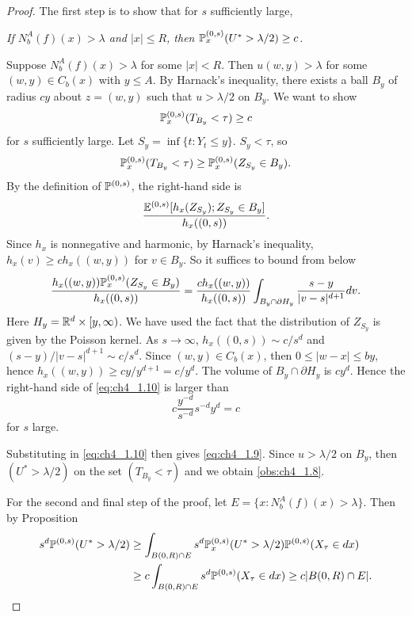 \begin{proof}
The first step is to show that for $s$ sufficiently large,
\begin{obs}\label{obs:ch4_1.8}
    \textit{If $N_b^A(f)(x) > \lambda$ and $|x| \leq R$, then $\P_x^{(0,s)}(U^* > \lambda/2) \geq c$.}
\end{obs}

Suppose $N_b^A(f)(x) > \lambda$ for some $|x| < R$. Then $u(w,y) > \lambda$ for some $(w,y) \in C_b(x)$ with $y \leq A$. By Harnack's inequality, there exists a ball $B_y$ of radius $cy$ about $z=(w,y)$ such that $u > \lambda/2$ on $B_y$. We want to show
\begin{equation}\label{eq:ch4_1.9}
    \P_x^{(0,s)}(T_{B_y} < \tau) \geq c
\end{equation}
for $s$ sufficiently large. Let $S_y = \inf\{t : Y_t \leq y\}$. $S_y < \tau$, so
\[
    \P_x^{(0,s)}(T_{B_y} < \tau) \geq \P_x^{(0,s)}(Z_{S_y} \in B_y).
\]
By the definition of $\P^{(0,s)}$, the right-hand side is
\[
    \frac{\E^{(0,s)}[h_x(Z_{S_y}); Z_{S_y} \in B_y]}{h_x((0,s))}.
\]
\mnewpage
Since $h_x$ is nonnegative and harmonic, by Harnack's inequality, $h_x(v) \geq ch_x((w,y))$ for $v \in B_y$. So it suffices to bound from below
\begin{equation}\label{eq:ch4_1.10}
    \frac{h_x((w,y))\P_x^{(0,s)}(Z_{S_y} \in B_y)}{h_x((0,s))} = \frac{ch_x((w,y))}{h_x((0,s))}\int_{B_y \cap \partial H_y} \frac{s-y}{|v-s|^{d+1}}dv.
\end{equation}
Here $H_y = \R^d \times [y,\infty)$. We have used the fact that the distribution of $Z_{S_y}$ is given by the Poisson kernel. As $s \to \infty$, $h_x((0,s)) \sim c/s^d$ and $(s-y)/|v-s|^{d+1} \sim c/s^d$. Since $(w,y) \in C_b(x)$, then $0 \leq |w-x| \leq by$, hence $h_x((w,y)) \geq cy/y^{d+1} = c/y^d$. The volume of $B_y \cap \partial H_y$ is $cy^d$. Hence the right-hand side of \eqref{eq:ch4_1.10} is larger than
\[
    c\frac{y^{-d}}{s^{-d}} s^{-d}y^d = c
\]
for $s$ large.

Substituting in \eqref{eq:ch4_1.10} then gives \eqref{eq:ch4_1.9}. Since $u > \lambda/2$ on $B_y$, then $(U^* > \lambda/2)$ on the set $(T_{B_y} < \tau)$ and we obtain \eqref{obs:ch4_1.8}.

For the second and final step of the proof, let $E = \{x : N_b^A(f)(x) > \lambda\}$. Then by Proposition 
\begin{align*}
    s^d\P^{(0,s)}(U^* > \lambda/2) &\geq \int_{B(0,R)\cap E} s^d\P_x^{(0,s)}(U^* > \lambda/2)\P^{(0,s)}(X_\tau \in dx) \\
    &\geq c\int_{B(0,R)\cap E} s^d\P^{(0,s)}(X_\tau \in dx) \geq c|B(0,R) \cap E|.
\end{align*}
\end{proof}

